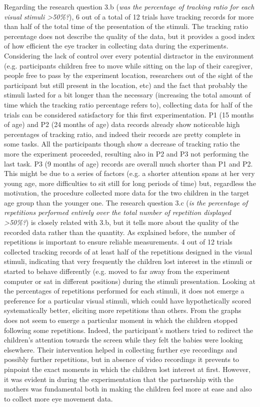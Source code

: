 Regarding the research question 3.b (\textit{was the percentage of tracking ratio for each visual stimuli \textgreater 50\%?}), 6 out of a total of 12 trials have tracking records for more than half of the total time of the presentation of the stimuli. The tracking ratio percentage does not describe the quality of the data, but it provides a good index of how efficient the eye tracker in collecting data during the experiments. Considering the lack of control over every potential distractor in the environment (e.g. participants children free to move while sitting on the lap of their caregiver, people free to pass by the experiment location, researchers out of the sight of the participant but still present in the location, etc) and the fact that probably the stimuli lasted for a bit longer than the necessary (increasing the total amount of time which the tracking ratio percentage refers to), collecting data for half of the trials can be considered satisfactory for this first experimentation. P1 (15 months of age) and P2 (24 months of age) data records already show noticeable high percentages of tracking ratio, and indeed their records are pretty complete in some tasks. All the participants though show a decrease of tracking ratio the more the experiment proceeded, resulting also in P2 and P3 not performing the last task. P3 (9 months of age) records are overall much shorter than P1 and P2. This might be due to a series of factors (e.g. a shorter attention spans at her very young age, more difficulties to sit still for long periods of time) but, regardless the motivation, the procedure collected more data for the two children in the target age group than the younger one.
The research question 3.c (\textit{is the percentage of repetitions performed entirely over the total number of repetition displayed \textgreater 50\%?}) is closely related with 3.b, but it tells more about the quality of the recorded data rather than the quantity. As explained before, the number of repetitions is important to ensure reliable measurements. 4 out of 12 trials collected tracking records of at least half of the repetitions designed in the visual stimuli, indicating that very frequently the children lost interest in the stimuli or started to behave differently (e.g. moved to far away from the experiment computer or sat in different positions) during the stimuli presentation. Looking at the percentages of repetitions performed for each stimuli, it does not emerge a preference for a particular visual stimuli, which could have hypothetically scored systematically better, eliciting more repetitions than others. From the graphs does not seem to emerge a particular moment in which the children stopped following some repetitions. Indeed, the participant’s mothers tried to redirect the children’s attention towards the screen while they felt the babies were looking elsewhere. Their intervention helped in collecting further eye recordings and possibly further repetitions, but in absence of video recordings it prevents to pinpoint the exact moments in which the children lost interest at first. However, it was evident in during the experimentation that the partnership with the mothers was fundamental both in making the children feel more at ease and also to collect more eye movement data.

